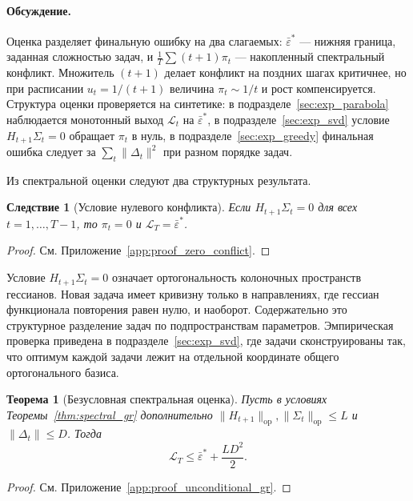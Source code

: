 \documentclass[a4paper,14pt,oneside,openany]{extarticle}
\newtheorem{theorem}{Теорема}
\newtheorem{corollary}{Следствие}
\newcommand{\cL}{\mathcal{L}}
\begin{document}
\paragraph{Обсуждение.}
Оценка разделяет финальную ошибку на два слагаемых: $\bar\varepsilon^*$ — нижняя граница, заданная сложностью задач, и $\tfrac{1}{T}\sum (t+1)\pi_t$ — накопленный спектральный конфликт. Множитель $(t+1)$ делает конфликт на поздних шагах критичнее, но при расписании $u_t = 1/(t+1)$ величина $\pi_t \sim 1/t$ и рост компенсируется. Структура оценки проверяется на синтетике: в подразделе~\ref{sec:exp_parabola} наблюдается монотонный выход $\cL_t$ на $\bar\varepsilon^*$, в подразделе~\ref{sec:exp_svd} условие $H_{t+1}\Sigma_t = 0$ обращает $\pi_t$ в нуль, в подразделе~\ref{sec:exp_greedy} финальная ошибка следует за $\sum_t \|\Delta_t\|^2$ при разном порядке задач.

Из спектральной оценки следуют два структурных результата.

\begin{corollary}[Условие нулевого конфликта]\label{cor:zero_conflict_gr}
    Если $H_{t+1} \Sigma_t = 0$ для всех $t = 1, \ldots, T-1$, то $\pi_t = 0$ и $\cL_T = \bar\varepsilon^*$.
\end{corollary}

\begin{proof}См. Приложение~\ref{app:proof_zero_conflict}.\end{proof}

Условие $H_{t+1} \Sigma_t = 0$ означает ортогональность колоночных пространств гессианов. Новая задача имеет кривизну только в направлениях, где гессиан функционала повторения равен нулю, и наоборот. Содержательно это структурное разделение задач по подпространствам параметров. Эмпирическая проверка приведена в подразделе~\ref{sec:exp_svd}, где задачи сконструированы так, что оптимум каждой задачи лежит на отдельной координате общего ортогонального базиса.

\begin{theorem}[Безусловная спектральная оценка]\label{thm:unconditional_gr}
    Пусть в условиях Теоремы~\ref{thm:spectral_gr} дополнительно $\|H_{t+1}\|_{\text{op}}, \|\Sigma_t\|_{\text{op}} \le L$ и $\|\Delta_t\| \le D$. Тогда
    \begin{equation}
        \cL_T \le \bar\varepsilon^* + \frac{L D^2}{2}.
        \label{eq:LD2_gr}
    \end{equation}
\end{theorem}

\begin{proof}См. Приложение~\ref{app:proof_unconditional_gr}.\end{proof}
\end{document}

